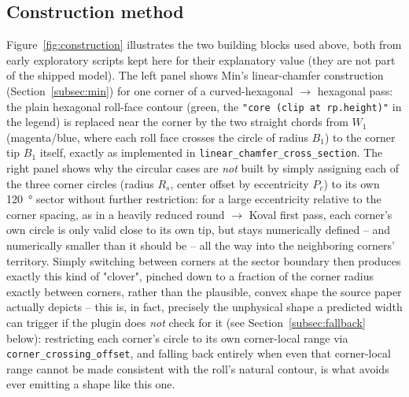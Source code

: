 \documentclass[11pt]{PyRollDocs}
\begin{document}
    \subsection{Construction method}\label{subsec:construction-method}

    Figure~\ref{fig:construction} illustrates the two building blocks used above, both
    from early exploratory scripts kept here for their explanatory value (they are not
    part of the shipped model). The left panel shows Min's linear-chamfer construction
    (Section~\ref{subsec:min}) for one corner of a curved-hexagonal $\to$ hexagonal
    pass: the plain hexagonal roll-face contour (green, the \texttt{"core (clip at
    rp.height)"} in the legend) is replaced near the corner by the two straight chords
    from $W_1$ (magenta/blue, where each roll face crosses the circle of radius $B_1$)
    to the corner tip $B_1$ itself, exactly as implemented in
    \texttt{linear\_chamfer\_cross\_section}. The right panel shows why the circular
    cases are \emph{not} built by simply assigning each of the three corner circles
    (radius $R_s$, center offset by eccentricity $P_c$) to its own \SI{120}{\degree}
    sector without further restriction: for a large eccentricity relative to the
    corner spacing, as in a heavily reduced round $\to$ Koval first pass, each corner's
    own circle is only valid close to its own tip, but stays numerically defined --
    and numerically smaller than it should be -- all the way into the neighboring
    corners' territory. Simply switching between corners at the sector boundary then
    produces exactly this kind of "clover", pinched down to a fraction of the corner
    radius exactly between corners, rather than the plausible, convex shape the source
    paper actually depicts -- this is, in fact, precisely the unphysical shape a
    predicted width can trigger if the plugin does \emph{not} check for it (see
    Section~\ref{subsec:fallback} below): restricting each corner's circle to its own
    corner-local range via \texttt{corner\_crossing\_offset}, and falling back
    entirely when even that corner-local range cannot be made consistent with the
    roll's natural contour, is what avoids ever emitting a shape like this one.
\end{document}
